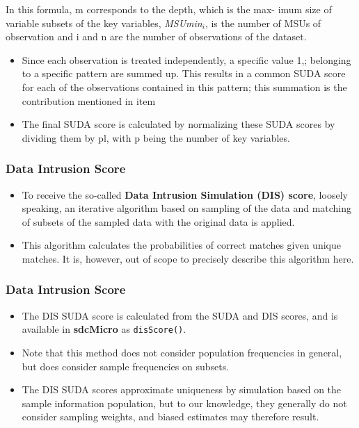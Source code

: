 \documentclass{beamer}
\begin{document}
	\begin{frame}
		
		In this formula, m corresponds to the depth, which is the max-
		imum size of variable subsets of the key variables, \textit{MSUmin}$_i$, is the number of
		MSUs of observation and i and n are the number of observations of the dataset.
		\begin{itemize}
			\item Since each observation is treated independently, a speciﬁc value 1,; belonging to a
			speciﬁc pattern are summed up. This results in a common SUDA score for each
			of the observations contained in this pattern; this summation is the contribution
			mentioned in item 
			\item The final SUDA score is calculated by normalizing these SUDA scores by dividing them by pl, with p being the number of key variables.
		\end{itemize}
	\end{frame}
	\begin{frame}
		\frametitle{Data Intrusion Score}
		\begin{itemize} 
			\item To receive the so-called
			\textbf{Data Intrusion Simulation (DIS) score}, loosely speaking, an iterative algorithm
			based on sampling of the data and matching of subsets of the sampled data with
			the original data is applied. 
			\item This algorithm calculates the probabilities of correct
			matches given unique matches. It is, however, out of scope to precisely describe
			this algorithm here. %
		\end{itemize}
	\end{frame}
	\begin{frame}
		\frametitle{Data Intrusion Score}
		\begin{itemize} 
			\item The DIS SUDA score is calculated from the SUDA and DIS scores, and is available in \textbf{sdcMicro} as \texttt{disScore()}.
			\item Note that this method does not consider population frequencies in general, but
			does consider sample frequencies on subsets. 
			\item The DIS SUDA scores approximate
			uniqueness by simulation based on the sample information population, but to our
			knowledge, they generally do not consider sampling weights, and biased estimates
			may therefore result.
		\end{itemize}
	\end{frame}
\end{document}
